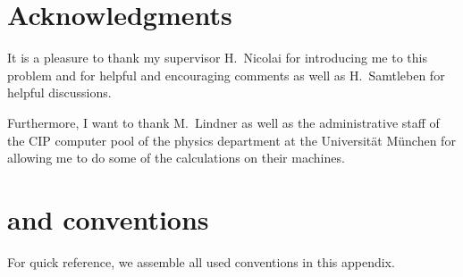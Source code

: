 \documentclass[a4paper,12pt]{article}
\begin{document}
\section{Acknowledgments}

It is a pleasure to thank my supervisor H.~Nicolai for introducing me
to this problem and for helpful and encouraging comments as well as
H.~Samtleben for helpful discussions.

Furthermore, I want to thank M.~Lindner as well as the administrative
staff of the CIP computer pool of the physics department at the
Universit\"at M\"unchen for allowing me to do some of the calculations
on their machines.

\newpage
\appendix
\renewcommand{\theequation}{\Alph{section}.\arabic{equation}}
\renewcommand{\thesection}{Appendix \Alph{section}:}

\section{\coordHE{} and \coordHE{} conventions}

For quick reference, we assemble all used conventions in this
appendix.
\end{document}
